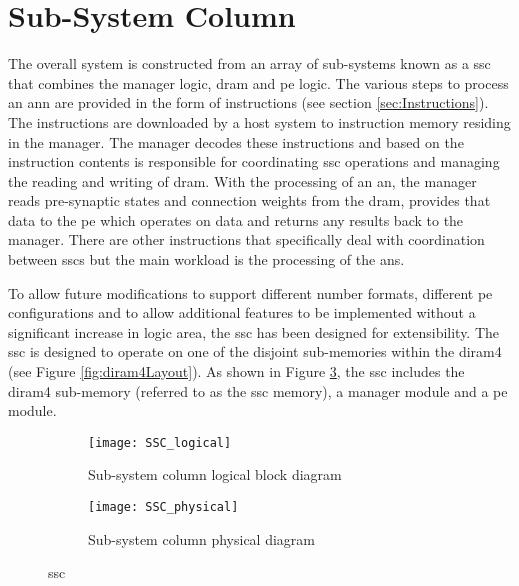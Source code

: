 \section{Sub-System Column}
\label{sec:Sub-System Column}

The overall system is constructed from an array of sub-systems known as a \acf{ssc} that combines the manager logic, \ac{dram} and \ac{pe} logic.
The various steps to process an \ac{ann} are provided in the form of instructions (see section \ref{sec:Instructions}). 
The instructions are downloaded by a host system to instruction memory residing in the manager.
The manager decodes these instructions and based on the instruction contents is responsible for coordinating \ac{ssc} operations and managing the reading and writing of \ac{dram}.
With the processing of an \ac{an}, the manager reads pre-synaptic states and connection weights from the \ac{dram}, provides that data to the \ac{pe} which operates on data and returns any results back to the manager.
There are other instructions that specifically deal with coordination between \acp{ssc} but the main workload is the processing of the \acp{an}.

To allow future modifications to support different number formats, different \ac{pe} configurations and to allow additional features to be implemented without a significant increase in logic area,
the \ac{ssc} has been designed for extensibility.
The \ac{ssc} is designed to operate on one of the disjoint sub-memories within the \ac{diram4} (see Figure \ref{fig:diram4Layout}).
As shown in Figure \ref{fig:SSC}, the \ac{ssc} includes the \ac{diram4} sub-memory (referred to as the \ac{ssc} memory), a manager module and a \ac{pe} module.
\begin{figure}
\centering
\begin{subfigure}{.44\textwidth}
  \centering
  \texttt{[image: SSC\_logical]}
  \captionsetup{justification=centering, skip=10pt}
  \vspace{-6pt}
  \caption{Sub-system column logical block diagram}
  \label{fig:Sub-system Column Logical Block Diagram}
\end{subfigure}%
\begin{subfigure}{.54\textwidth}
  \centering
  \texttt{[image: SSC\_physical]}
  \captionsetup{justification=centering, skip=10pt}
  \vspace{20pt}
  \caption{Sub-system column physical diagram}
  \label{fig:Sub-system Column Physical Diagram}
\end{subfigure}
\captionsetup{justification=centering, skip=12pt}
\caption{\acf{ssc}}
\label{fig:SSC}
\end{figure}

